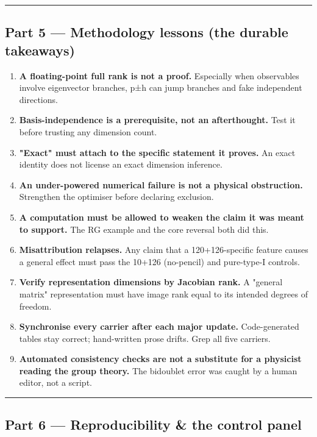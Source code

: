 \documentclass[11pt]{article}
\begin{document}
\vspace{4pt}\hrule\vspace{4pt}

\subsection*{Part 5 --- Methodology lessons (the durable takeaways)}

\begin{enumerate}
\item \textbf{A floating-point full rank is not a proof.} Especially when observables
   involve eigenvector branches, p±h can jump branches and fake independent
   directions.
\item \textbf{Basis-independence is a prerequisite, not an afterthought.} Test it before
   trusting any dimension count.
\item \textbf{"Exact" must attach to the specific statement it proves.} An exact identity
   does not license an exact dimension inference.
\item \textbf{An under-powered numerical failure is not a physical obstruction.} Strengthen
   the optimiser before declaring exclusion.
\item \textbf{A computation must be allowed to weaken the claim it was meant to support.}
   The RG example and the core reversal both did this.
\item \textbf{Misattribution relapses.} Any claim that a 120+126-specific feature causes a
   general effect must pass the 10+126 (no-pencil) and pure-type-I controls.
\item \textbf{Verify representation dimensions by Jacobian rank.} A "general matrix"
   representation must have image rank equal to its intended degrees of freedom.
\item \textbf{Synchronise every carrier after each major update.} Code-generated tables
   stay correct; hand-written prose drifts. Grep all five carriers.
\item \textbf{Automated consistency checks are not a substitute for a physicist reading the
   group theory.} The bidoublet error was caught by a human editor, not a script.
\end{enumerate}

\vspace{4pt}\hrule\vspace{4pt}

\subsection*{Part 6 --- Reproducibility \& the control panel}
\end{document}
